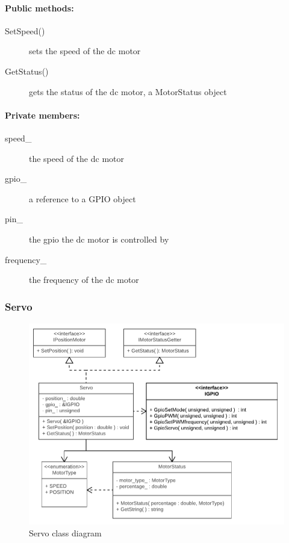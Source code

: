 \paragraph{Public methods:}
\begin{adjustwidth}{2.5em}{0pt}\begin{description}
		\item [SetSpeed()] sets the speed of the dc motor
		\item [GetStatus()] gets the status of the dc motor, a MotorStatus object
\end{description}\end{adjustwidth}

\paragraph{Private members:}
\begin{adjustwidth}{2.5em}{0pt}\begin{description}
		\item [speed_] the speed of the dc motor
		\item [gpio_] a reference to a GPIO object
		\item [pin_] the gpio the dc motor is controlled by
		\item [frequency_] the frequency of the dc motor
\end{description}\end{adjustwidth}

\subsubsection{Servo}

\begin{figure}[H]
\centering
\includegraphics[width=1\linewidth]{Images/Design/Servo_class_diagram}
\caption{Servo class diagram}
\label{fig:servo}
\end{figure}

